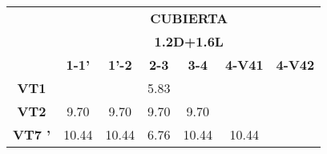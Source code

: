 \begin{table}[H]
  \centering
\begin{tabular}{|c|c|c|c|c|c|c|} 
\hhline{~------|}
\multicolumn{1}{c|}{}                             & \multicolumn{6}{c|}{{\cellcolor[rgb]{0.741,0.89,0.741}}\textbf{CUBIERTA}}                                                                                                                                                                                                                                        \\ 
\hhline{~------|}
\multicolumn{1}{c|}{}                             & \multicolumn{6}{c|}{{\cellcolor[rgb]{0.741,0.89,0.741}}\textbf{1.2D+1.6L}}                                                                                                                                                                                                                                       \\ 
\hhline{~------|}
\multicolumn{1}{c|}{}                             & {\cellcolor[rgb]{0.741,0.89,0.741}}\textbf{1-1'} & {\cellcolor[rgb]{0.741,0.89,0.741}}\textbf{1'-2} & {\cellcolor[rgb]{0.741,0.89,0.741}}\textbf{2-3} & {\cellcolor[rgb]{0.741,0.89,0.741}}\textbf{3-4} & {\cellcolor[rgb]{0.741,0.89,0.741}}\textbf{4-V41} & {\cellcolor[rgb]{0.741,0.89,0.741}}\textbf{4-V42}  \\ 
\hline
{\cellcolor[rgb]{0.741,0.89,0.741}}\textbf{VT1}   & ~                                                & ~                                                & 5.83                                            & ~                                               & ~                                                 & ~                                                  \\ 
\hline
{\cellcolor[rgb]{0.741,0.89,0.741}}\textbf{VT2}   & 9.70                                             & 9.70                                             & 9.70                                            & 9.70                                            & ~                                                 & ~                                                  \\ 
\hline
{\cellcolor[rgb]{0.741,0.89,0.741}}\textbf{VT7 '} & 10.44                                            & 10.44                                            & 6.76                                            & 10.44                                           & 10.44                                             & ~                                                  \\ 

\end{tabular}
\end{table}
